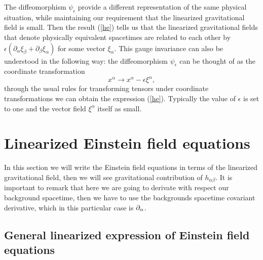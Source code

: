 The diffeomorphism $\psi_{\epsilon}$ provide a different representation
of the same physical situation, while maintaining our requirement
that the linearized gravitational field is small. Then the result
(\ref{he}) tells us that the linearized gravitational fields that
denote physically equivalent spacetimes are related to each other
by $\epsilon\left(\partial_{\alpha}\xi_{\beta}+\partial_{\beta}\xi_{\alpha}\right)$
for some vector $\xi_{\alpha}$. This gauge invariance can also be
understood in the following way: the diffeomorphism $\psi_{\epsilon}$
can be thought of as the coordinate transformation
\begin{equation}
x^{\alpha}\rightarrow x^{\alpha}-\epsilon\xi^{\alpha},\label{ee}
\end{equation}
through the usual rules for transforming tensors under coordinate
transformations we can obtain the expression (\ref{he}). Typically
the value of $\epsilon$ is set to one and the vector field $\xi^{\alpha}$
itself as small.

\section{Linearized Einstein field equations}

In this section we will write the Einstein field equations in terms
of the linearized gravitational field, then we will see gravitational
contribution of $h_{\alpha\beta}$. It is important to remark that
here we are going to derivate with respect our background spacetime,
then we have to use the backgrounds spacetime covariant derivative,
which in this particular case is $\partial_{\text{\ensuremath{\alpha}}}$.

\subsection{General linearized expression of Einstein field equations}

